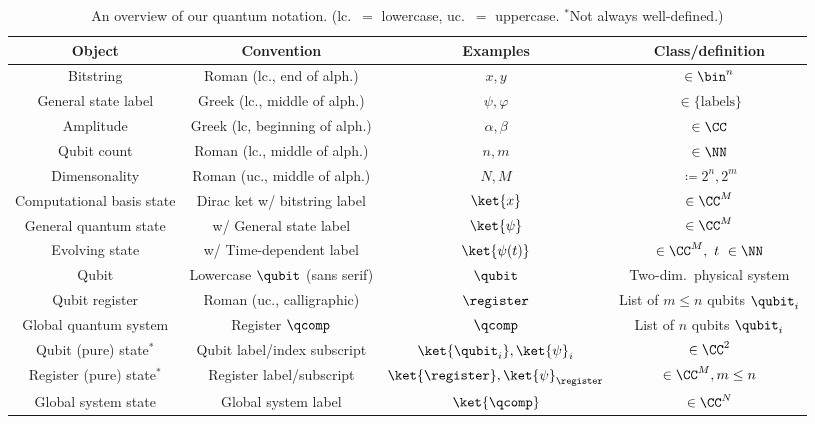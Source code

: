     \begin{table}%
      \centering
      \caption{
        \label{tab:notation}
        An overview of our quantum notation. (lc.\ $=$ lowercase, uc.\
        $=$ uppercase. ${}^*$Not always well-defined.)
      }
      \begin{tabular}{cccc}
        \toprule
        Object & Convention & Examples & Class/definition \\
        \midrule
        Bitstring & Roman (lc., end of alph.) & $x,y$ & $\in \bin^n$ \\
        General state label & Greek (lc., middle of alph.) & $\psi,\varphi$ & $\in \{\text{labels}\}$ \\
        Amplitude & Greek (lc, beginning of alph.) & $\alpha,\beta$ & $\in \CC$ \\
        Qubit count & Roman (lc., middle of alph.) & $n,m$ & $\in \NN$ \\
        Dimensonality & Roman (uc., middle of alph.) & $N,M$ & $\coloneqq 2^n, 2^m$ \\
        \midrule
        Computational basis state & Dirac ket w/ bitstring label & $\ket{x}$ & $\in \CC^{M}$ \\
        General quantum state & w/ General state label & $\ket{\psi}$ & $\in \CC^M$ \\
        Evolving state & w/ Time-dependent label & $\ket{\psi(t)}$ & $\in \CC^M,\ t \in \NN$ \\
        \midrule
        Qubit & Lowercase $\qubit$ (sans serif) & $\qubit$ & Two-dim.\ physical system \\
        Qubit register & Roman (uc., calligraphic) & $\register$ & List of $m \leq n$ qubits $\qubit_i$\\
        Global quantum system & Register $\qcomp$ & $\qcomp$ & List of $n$ qubits $\qubit_i$ \\
        \midrule
        Qubit (pure) state$^*$ & Qubit label/index subscript & $\ket{\qubit_i}, \ket{\psi}_i$ & $\in \CC^2$ \\
        Register (pure) state$^*$ & Register label/subscript & $\ket{\register}, \ket{\psi}_{\register}$ & $\in \CC^M, m \leq n$ \\
        Global system state & Global system label & $\ket{\qcomp}$ & $\in \CC^N$ \\
        \midrule

\end{tabular}
\end{table}
